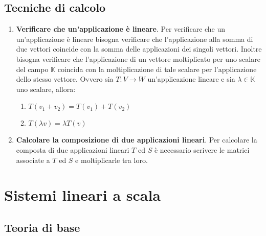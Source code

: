 \documentclass[12pt,a4paper,oneside]{book}
\begin{document}
\newpage

			  \section{Tecniche di calcolo}
			  
\begin{enumerate}
\item \textbf{Verificare che un'applicazione è lineare}. \linebreak
	  Per verificare che un un'applicazione è lineare bisogna verificare che l'applicazione alla somma di 
	  due vettori coincide con la somma delle applicazioni dei singoli vettori. Inoltre bisogna verificare 
	  che l'applicazione di un vettore moltiplicato per uno scalare del campo $\mathbb{K}$ coincida con la 
	  moltiplicazione di tale scalare per l'applicazione dello stesso vettore. \linebreak
	  Ovvero sia $T:V\rightarrow W$ un'applicazione lineare e sia $\lambda \in \mathbb{K}$ uno scalare, 
	  allora:
	  
	  \begin{enumerate}
	  \item $T(v_1+v_2) = T(v_1) + T(v_2)$
	  \item $T(\lambda v) = \lambda T(v)$
	  \end{enumerate}


\item \textbf{Calcolare la composizione di due applicazioni lineari}. \linebreak
	  Per calcolare la composta di due applicazioni lineari $T$ ed $S$ è necessario scrivere le matrici
	  associate a $T$ ed $S$ e moltiplicarle tra loro.
	
\end{enumerate}




\newpage
				 \chapter{Sistemi lineari a scala}

			   		  \section{Teoria di base}
			   
\end{document}
